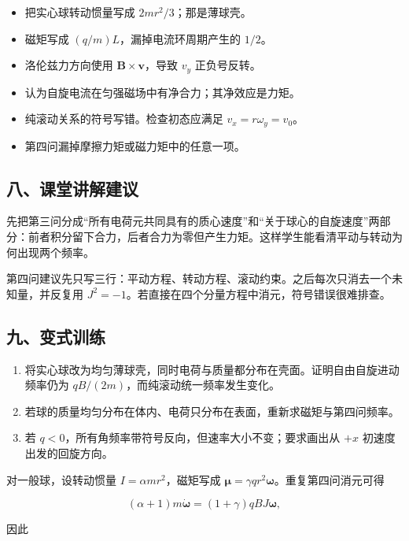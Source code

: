 \documentclass[12pt,a4paper,UTF8]{ctexart}
\newcommand{\tightlist}{\setlength{\itemsep}{0pt}\setlength{\parskip}{0pt}}
\begin{document}
\begin{itemize}
\tightlist
\item
  把实心球转动惯量写成 \(2mr^2/3\)；那是薄球壳。
\item
  磁矩写成 \((q/m)L\)，漏掉电流环周期产生的 \(1/2\)。
\item
  洛伦兹力方向使用 \(\bm B\times\bm v\)，导致 \(v_y\) 正负号反转。
\item
  认为自旋电流在匀强磁场中有净合力；其净效应是力矩。
\item
  纯滚动关系的符号写错。检查初态应满足 \(v_x=r\omega_y=v_0\)。
\item
  第四问漏掉摩擦力矩或磁力矩中的任意一项。
\end{itemize}

\subsection{八、课堂讲解建议}\label{ux516bux8bfeux5802ux8bb2ux89e3ux5efaux8bae-2}

先把第三问分成``所有电荷元共同具有的质心速度''和``关于球心的自旋速度''两部分：前者积分留下合力，后者合力为零但产生力矩。这样学生能看清平动与转动为何出现两个频率。

第四问建议先只写三行：平动方程、转动方程、滚动约束。之后每次只消去一个未知量，并反复用
\(J^2=-1\)。若直接在四个分量方程中消元，符号错误很难排查。

\subsection{九、变式训练}\label{ux4e5dux53d8ux5f0fux8badux7ec3-2}

\begin{enumerate}
\def\labelenumi{\arabic{enumi}.}
\tightlist
\item
  将实心球改为均匀薄球壳，同时电荷与质量都分布在壳面。证明自由自旋进动频率仍为
  \(qB/(2m)\)，而纯滚动统一频率发生变化。
\item
  若球的质量均匀分布在体内、电荷只分布在表面，重新求磁矩与第四问频率。
\item
  若 \(q<0\)，所有角频率带符号反向，但速率大小不变；要求画出从 \(+x\)
  初速度出发的回旋方向。
\end{enumerate}

对一般球，设转动惯量 \(I=\alpha mr^2\)，磁矩写成
\(\bm\mu=\gamma q r^2\bm\omega\)。重复第四问消元可得

\[(\alpha+1)m\dot{\bm\omega}=(1+\gamma)qB J\bm\omega,\]

因此
\end{document}
